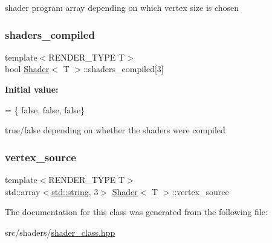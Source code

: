 shader program array depending on which vertex size is chosen \mbox{\label{classShader_a057162ea090f838f7fbb658cb301efc4}} 
\subsubsection{\texorpdfstring{shaders\+\_\+compiled}{shaders\_compiled}}
{\footnotesize\ttfamily template$<$R\+E\+N\+D\+E\+R\+\_\+\+T\+Y\+PE T$>$ \\
bool \mbox{\hyperlink{classShader}{Shader}}$<$ T $>$\+::shaders\+\_\+compiled\mbox{[}3\mbox{]}\hspace{0.3cm}{\ttfamily [protected]}}

{\bfseries Initial value\+:}
\begin{DoxyCode}
= \{
        \textcolor{keyword}{false}, \textcolor{keyword}{false},
        \textcolor{keyword}{false}\}
\end{DoxyCode}
true/false depending on whether the shaders were compiled \mbox{\label{classShader_a5b01f3b14e03a34da48da6906e9acc1f}} 
\subsubsection{\texorpdfstring{vertex\+\_\+source}{vertex\_source}}
{\footnotesize\ttfamily template$<$R\+E\+N\+D\+E\+R\+\_\+\+T\+Y\+PE T$>$ \\
std\+::array$<$\mbox{\hyperlink{glad_8h_ac83513893df92266f79a515488701770}{std\+::string}}, 3$>$ \mbox{\hyperlink{classShader}{Shader}}$<$ T $>$\+::vertex\+\_\+source\hspace{0.3cm}{\ttfamily [protected]}}



The documentation for this class was generated from the following file\+:\begin{DoxyCompactItemize}
\item 
src/shaders/\mbox{\hyperlink{shader__class_8hpp}{shader\+\_\+class.\+hpp}}\end{DoxyCompactItemize}
